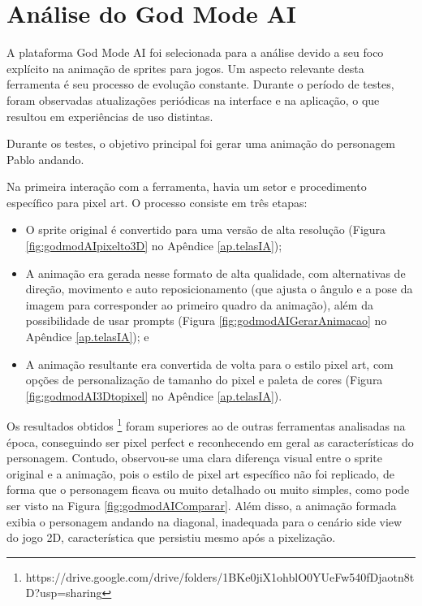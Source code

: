 \FloatBarrier
\section{Análise do God Mode AI}
\label{s.godmodeAI}

A plataforma God Mode AI foi selecionada para a análise devido a seu foco explícito na animação de sprites para jogos. Um aspecto relevante desta ferramenta é seu processo de evolução constante. Durante o período de testes, foram observadas atualizações periódicas na interface e na aplicação, o que resultou em experiências de uso distintas.

Durante os testes, o objetivo principal foi gerar uma animação do personagem Pablo andando. 

Na primeira interação com a ferramenta, havia um setor e procedimento específico para pixel art. O processo consiste em três etapas: \begin{itemize}
    \item O sprite original é convertido para uma versão de alta resolução (Figura \ref{fig:godmodAIpixelto3D} no Apêndice \ref{ap.telasIA}); 
    \item A animação era gerada nesse formato de alta qualidade, com alternativas de direção, movimento e auto reposicionamento (que ajusta o ângulo e a pose da imagem para corresponder ao primeiro quadro da animação), além da possibilidade de usar prompts (Figura \ref{fig:godmodAIGerarAnimacao} no Apêndice \ref{ap.telasIA}); e
    \item A animação resultante era convertida de volta para o estilo pixel art, com opções de personalização de tamanho do pixel e paleta de cores (Figura \ref{fig:godmodAI3Dtopixel} no Apêndice \ref{ap.telasIA}).
\end{itemize}

Os resultados obtidos \footnote{https://drive.google.com/drive/folders/1BKe0jiX1ohblO0YUeFw540fDjaotn8tD?usp=sharing} foram superiores ao de outras ferramentas analisadas na época, conseguindo ser pixel perfect e reconhecendo em geral as características do personagem. Contudo, observou-se uma clara diferença visual entre o sprite original e a animação, pois o estilo de pixel art específico não foi replicado, de forma que o personagem ficava ou muito detalhado ou muito simples, como pode ser visto na Figura \ref{fig:godmodAIComparar}. Além disso, a animação formada exibia o personagem andando na diagonal, inadequada para o cenário side view do jogo 2D, característica que persistiu mesmo após a pixelização.

